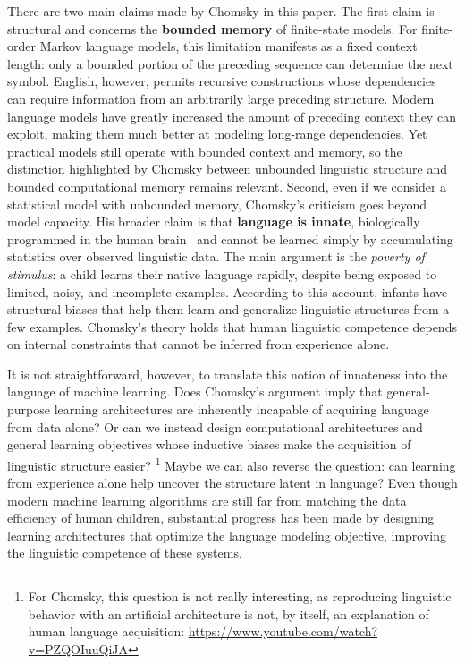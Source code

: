 There are two main claims made by Chomsky in this paper. 
The first claim is structural and concerns the \textbf{bounded memory} of finite-state models.
For finite-order Markov language models, this limitation manifests as a fixed context length: 
only a bounded portion of the preceding sequence can determine the next symbol.
English, however, permits recursive constructions whose dependencies can require information 
from an arbitrarily large preceding structure.
Modern language models have greatly increased the amount of preceding context they can exploit, 
making them much better at modeling long-range dependencies. 
Yet practical models still operate with bounded context and memory, 
so the distinction highlighted by Chomsky between 
unbounded linguistic structure and bounded computational memory remains relevant. 
Second, even if we consider a statistical model with unbounded memory, 
Chomsky's criticism goes beyond model capacity. His broader claim is that \textbf{language is innate},
biologically programmed in the human brain~\citep{chomsky1965aspects} and 
cannot be learned simply by accumulating statistics over observed linguistic data.
The main argument is the \textit{poverty of stimulus}: a child learns their native language rapidly,
despite being exposed to limited, noisy, and incomplete examples. According to this account, infants have structural biases that help them learn and generalize linguistic structures from a few examples.
Chomsky's theory holds that human linguistic competence depends on internal constraints 
that cannot be inferred from experience alone.

It is not straightforward, however, to translate this notion of innateness into 
the language of machine learning. Does Chomsky's argument imply that general-purpose 
learning architectures are inherently incapable of acquiring language from data alone? 
Or can we instead design computational architectures and general learning objectives whose inductive biases make
the acquisition of linguistic structure easier?
\footnote{For Chomsky, this question is not really interesting, 
    as reproducing linguistic behavior with an artificial architecture is not, 
    by itself, an explanation of human language acquisition: 
    \url{https://www.youtube.com/watch?v=PZQOIuuQiJA}}
Maybe we can also reverse the question: can learning from experience alone help
uncover the structure latent in language? Even though modern machine learning algorithms are still far from matching
the data efficiency of human children, substantial progress has been made by
designing learning architectures that optimize the language modeling objective, improving
the linguistic competence of these systems.

